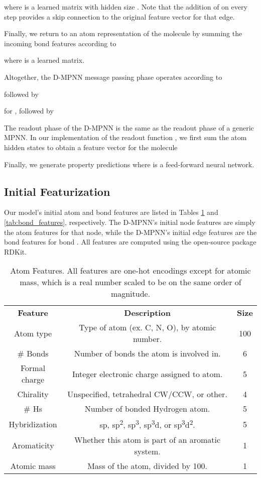 \documentclass[journal=jcisd8,manuscript=article]{achemso}
\begin{document}
where  is a learned matrix with hidden size . Note that the addition of  on every step provides a skip connection to the original feature vector for that edge.

Finally, we return to an atom representation of the molecule by summing the incoming bond features according to

where  is a learned matrix.

Altogether, the D-MPNN message passing phase operates according to

followed by

for , followed by


The readout phase of the D-MPNN is the same as the readout phase of a generic MPNN. In our implementation of the readout function , we first sum the atom hidden states to obtain a feature vector for the molecule

Finally, we generate property predictions  where  is a feed-forward neural network.

\subsection{Initial Featurization}

Our model's initial atom and bond features are listed in Tables \ref{tab:atom_features} and \ref{tab:bond_features}, respectively. The D-MPNN's initial node features  are simply the atom features for that node, while the D-MPNN's initial edge features  are the bond features for bond . All features are computed using the open-source package RDKit\cite{landrum2006rdkit}. 


\FloatBarrier

\begin{table}[]
    \centering
    \begin{tabular}{|c|c|c|}
        \hline
        \textbf{Feature} & \textbf{Description} & \textbf{Size} \\
        \Xhline{2\arrayrulewidth}
        Atom type & Type of atom (ex. C, N, O), by atomic number. & 100 \\
        \# Bonds & Number of bonds the atom is involved in. & 6 \\
        Formal charge & Integer electronic charge assigned to atom. & 5 \\
        Chirality & Unspecified, tetrahedral CW/CCW, or other. & 4 \\
        \# Hs & Number of bonded Hydrogen atom. & 5 \\
        Hybridization & sp, sp\textsuperscript{2}, sp\textsuperscript{3}, sp\textsuperscript{3}d, or sp\textsuperscript{3}d\textsuperscript{2}. & 5 \\
        Aromaticity & Whether this atom is part of an aromatic system. & 1 \\
        Atomic mass & Mass of the atom, divided by 100. & 1 \\
        \hline
    \end{tabular}
    \caption{Atom Features. All features are one-hot encodings except for atomic mass, which is a real number scaled to be on the same order of magnitude.}
    \label{tab:atom_features}
\end{table}
\end{document}
